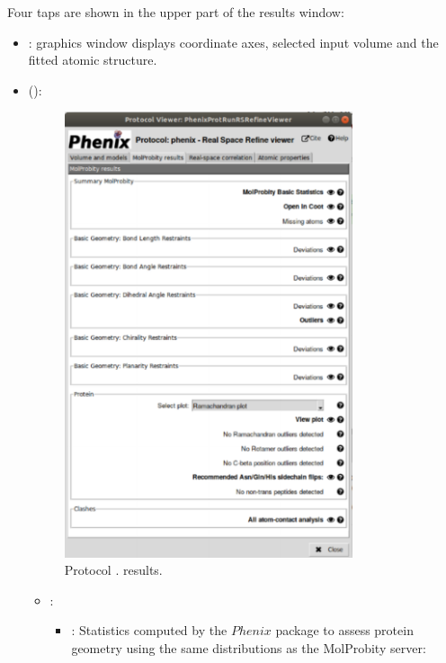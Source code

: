 \begin{itemize}
Four taps are shown in the upper part of the results window:
   \begin{itemize}
     \item {}:
     \chimera graphics window displays coordinate axes, selected input volume and the fitted atomic structure.
     \item {} ():
        \begin{figure}[H]
         \centering 
         \captionsetup{width=.7\linewidth} 
         \includegraphics[width=0.80\textwidth]{Images_appendix/Fig150.pdf}
         \caption{Protocol . \phenix {} results.}
         \label{fig:app_protocol_real_space_refine_3}
        \end{figure}
        
        \begin{itemize}
         \item {}: 
          \begin{itemize}
           \item {}: Statistics computed by the $Phenix$ package to assess protein geometry using the same distributions as the MolProbity server:\setlength{\parindent}{12pt}\\
           

\end{itemize}
\end{itemize}
\end{itemize}
\end{itemize}
